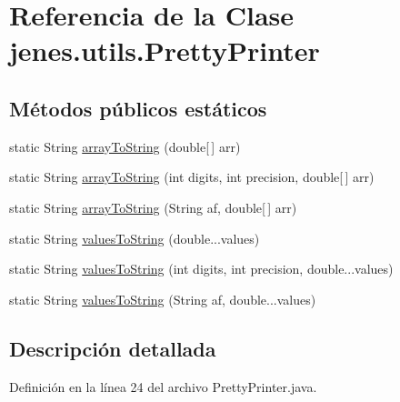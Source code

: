 \hypertarget{classjenes_1_1utils_1_1_pretty_printer}{\section{Referencia de la Clase jenes.\-utils.\-Pretty\-Printer}
\label{classjenes_1_1utils_1_1_pretty_printer}
}
\subsection*{Métodos públicos estáticos}
\begin{DoxyCompactItemize}
\item 
static String \hyperlink{classjenes_1_1utils_1_1_pretty_printer_af1b7970ec18b6a847d1857cd9c804ff3}{array\-To\-String} (double\mbox{[}$\,$\mbox{]} arr)
\item 
static String \hyperlink{classjenes_1_1utils_1_1_pretty_printer_a4aea4a04a4f1c86a0b69c66b6831705d}{array\-To\-String} (int digits, int precision, double\mbox{[}$\,$\mbox{]} arr)
\item 
static String \hyperlink{classjenes_1_1utils_1_1_pretty_printer_a2bf0b08b7aeaa282a3169be54103e0a0}{array\-To\-String} (String af, double\mbox{[}$\,$\mbox{]} arr)
\item 
static String \hyperlink{classjenes_1_1utils_1_1_pretty_printer_a15b2c468ec5e89b449a51a532d3b2601}{values\-To\-String} (double...\-values)
\item 
static String \hyperlink{classjenes_1_1utils_1_1_pretty_printer_af380a69bc4dac9e7dee1a178f26b4b12}{values\-To\-String} (int digits, int precision, double...\-values)
\item 
static String \hyperlink{classjenes_1_1utils_1_1_pretty_printer_a89c8fe653fb9bd04437bc2dcde97718e}{values\-To\-String} (String af, double...\-values)
\end{DoxyCompactItemize}


\subsection{Descripción detallada}


Definición en la línea 24 del archivo Pretty\-Printer.\-java.



